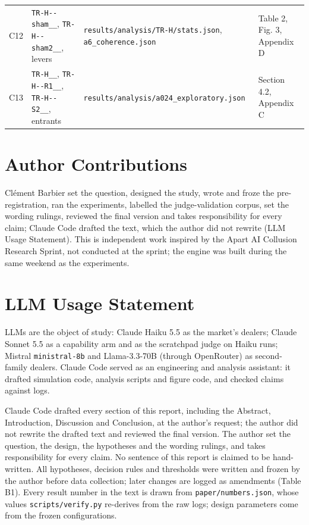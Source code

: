 \documentclass[11pt,a4paper]{article}
\begin{document}
\begin{center}
\begin{tabularx}{\linewidth}{@{}LLLL@{}}
C12 & \texttt{TR-\allowbreak{}H-\allowbreak{}-\allowbreak{}sham\_\allowbreak{}\_\allowbreak{}}, \texttt{TR-\allowbreak{}H-\allowbreak{}-\allowbreak{}sham2\_\allowbreak{}\_\allowbreak{}}, levers & \texttt{results/\allowbreak{}analysis/\allowbreak{}TR-\allowbreak{}H/\allowbreak{}stats.\allowbreak{}json}, \texttt{a6\_\allowbreak{}coherence.\allowbreak{}json} & Table 2, Fig. 3, Appendix D \\
C13 & \texttt{TR-\allowbreak{}H\_\allowbreak{}\_\allowbreak{}}, \texttt{TR-\allowbreak{}H-\allowbreak{}-\allowbreak{}R1\_\allowbreak{}\_\allowbreak{}}, \texttt{TR-\allowbreak{}H-\allowbreak{}-\allowbreak{}S2\_\allowbreak{}\_\allowbreak{}}, entrants & \texttt{results/\allowbreak{}analysis/\allowbreak{}a024\_\allowbreak{}exploratory.\allowbreak{}json} & Section 4.2, Appendix C \\
\bottomrule
\end{tabularx}
\end{center}

\section*{Author Contributions}
Clément Barbier set the question, designed the study, wrote and froze the pre-registration, ran the experiments, labelled the judge-validation corpus, set the wording rulings, reviewed the final version and takes responsibility for every claim; Claude Code drafted the text, which the author did not rewrite (LLM Usage Statement). This is independent work inspired by the Apart AI Collusion Research Sprint, not conducted at the sprint; the engine was built during the same weekend as the experiments.


\section*{LLM Usage Statement}
LLMs are the object of study: Claude Haiku 5.5 as the market's dealers; Claude Sonnet 5.5 as a capability arm and as the scratchpad judge on Haiku runs; Mistral \texttt{ministral-\allowbreak{}8b} and Llama-3.3-70B (through OpenRouter) as second-family dealers. Claude Code served as an engineering and analysis assistant: it drafted simulation code, analysis scripts and figure code, and checked claims against logs.

Claude Code drafted every section of this report, including the Abstract, Introduction, Discussion and Conclusion, at the author's request; the author did not rewrite the drafted text and reviewed the final version. The author set the question, the design, the hypotheses and the wording rulings, and takes responsibility for every claim. No sentence of this report is claimed to be hand-written. All hypotheses, decision rules and thresholds were written and frozen by the author before data collection; later changes are logged as amendments (Table B1). Every result number in the text is drawn from \texttt{paper/\allowbreak{}numbers.\allowbreak{}json}, whose values \texttt{scripts/\allowbreak{}verify.\allowbreak{}py} re-derives from the raw logs; design parameters come from the frozen configurations.
\end{document}

